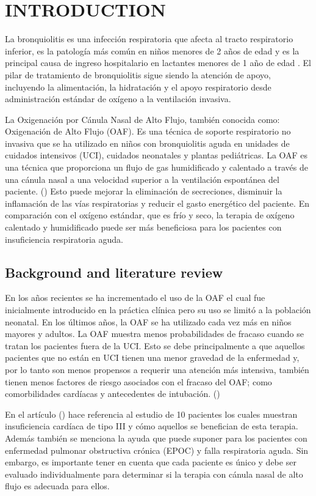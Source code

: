 \section{INTRODUCTION} \label{sec:itroduction}

La bronquiolitis es una infección respiratoria que afecta al tracto respiratorio inferior, es la patología más común en niños menores de 2 años de edad y es la principal causa de ingreso hospitalario en lactantes menores de 1 año de edad . El pilar de tratamiento de bronquiolitis sigue siendo la atención de apoyo, incluyendo la alimentación, la hidratación y el apoyo respiratorio desde administración estándar de oxígeno a la ventilación invasiva. 

La Oxigenación por Cánula Nasal de Alto Flujo, también conocida como: Oxigenación de Alto Flujo (OAF). Es una técnica de soporte respiratorio no invasiva que se ha utilizado en niños con bronquiolitis aguda en unidades de cuidados intensivos (UCI), cuidados neonatales y plantas pediátricas. La OAF es una técnica que proporciona un flujo de gas humidificado y calentado a través de una cánula nasal a una velocidad superior a la ventilación espontánea del paciente. (\cite{Daverio2019}) Esto puede mejorar la eliminación de secreciones, disminuir la inflamación de las vías respiratorias y reducir el gasto energético del paciente. En comparación con el oxígeno estándar, que es frío y seco, la terapia de oxígeno calentado y humidificado puede ser más beneficiosa para los pacientes con insuficiencia respiratoria aguda. 
\subsection{Background and literature review}

En los años recientes se ha incrementado el uso de la OAF el cual fue inicialmente introducido en la práctica clínica pero su uso se limitó a la población neonatal. En los últimos años, la OAF se ha utilizado cada vez más en niños mayores y adultos. La OAF muestra menos probabilidades de fracaso cuando se tratan los pacientes fuera de la UCI. Esto se debe principalmente a que aquellos pacientes que no están en UCI tienen una menor gravedad de la enfermedad y, por lo tanto son menos propensos a requerir una atención más intensiva, también tienen menos factores de riesgo asociados con el fracaso del OAF; como comorbilidades cardíacas y antecedentes de intubación. (\cite{Betters2017}) 

En el artículo (\cite{Lodeserto2018}) hace referencia al estudio de 10 pacientes los cuales muestran insuficiencia cardíaca de tipo III y cómo aquellos se benefician de esta terapia. Además también se menciona la ayuda que puede suponer para los pacientes con enfermedad pulmonar obstructiva crónica (EPOC) y falla respiratoria aguda. Sin embargo, es importante tener en cuenta que cada paciente es único y debe ser evaluado individualmente para determinar si la terapia con cánula nasal de alto flujo es adecuada para ellos.


